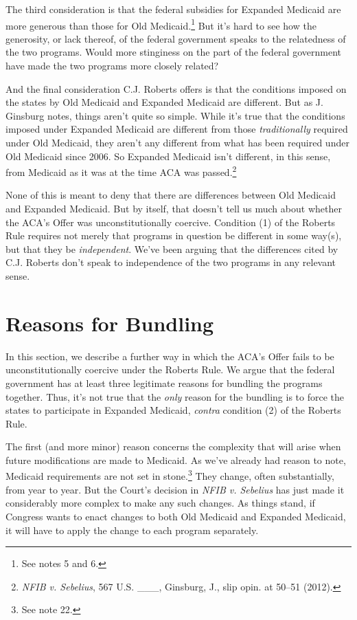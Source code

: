 \documentclass[
  11pt,
  letterpaper,
  DIV=11,
  numbers=noendperiod,
  twoside]{scrartcl}
\begin{document}
The third consideration is that the federal subsidies for Expanded
Medicaid are more generous than those for Old Medicaid.\footnote{See
  notes 5 and 6.} But it's hard to see how the generosity, or lack
thereof, of the federal government speaks to the relatedness of the two
programs. Would more stinginess on the part of the federal government
have made the two programs more closely related?

And the final consideration C.J. Roberts offers is that the conditions
imposed on the states by Old Medicaid and Expanded Medicaid are
different. But as J. Ginsburg notes, things aren't quite so simple.
While it's true that the conditions imposed under Expanded Medicaid are
different from those \emph{traditionally} required under Old Medicaid,
they aren't any different from what has been required under Old Medicaid
since 2006. So Expanded Medicaid isn't different, in this sense, from
Medicaid as it was at the time ACA was passed.\footnote{\emph{NFIB v.
  Sebelius}, 567 U.S. \_\_\_, Ginsburg, J., slip opin. at 50--51 (2012).}

None of this is meant to deny that there are differences between Old
Medicaid and Expanded Medicaid. But by itself, that doesn't tell us much
about whether the ACA's Offer was unconstitutionally coercive. Condition
(1) of the Roberts Rule requires not merely that programs in question be
different in some way(s), but that they be \emph{independent}. We've
been arguing that the differences cited by C.J. Roberts don't speak to
independence of the two programs in any relevant sense.

\section{Reasons for Bundling}\label{reasons-for-bundling}

In this section, we describe a further way in which the ACA's Offer
fails to be unconstitutionally coercive under the Roberts Rule. We argue
that the federal government has at least three legitimate reasons for
bundling the programs together. Thus, it's not true that the \emph{only}
reason for the bundling is to force the states to participate in
Expanded Medicaid, \emph{contra} condition (2) of the Roberts Rule.

The first (and more minor) reason concerns the complexity that will
arise when future modifications are made to Medicaid. As we've already
had reason to note, Medicaid requirements are not set in
stone.\footnote{See note 22.} They change, often substantially, from
year to year. But the Court's decision in \emph{NFIB v. Sebelius} has
just made it considerably more complex to make any such changes. As
things stand, if Congress wants to enact changes to both Old Medicaid
and Expanded Medicaid, it will have to apply the change to each program
separately.
\end{document}
